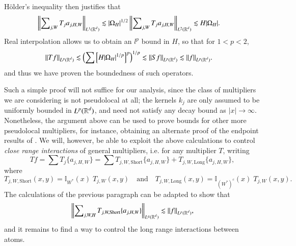 %
%
%
H\"{o}lder's inequality then justifies that
%
\begin{equation}
\begin{split}
  \left\| \sum\nolimits_{j,W} T_j a_{j,H,W} \right\|_{L^1(\operatorname{\mathbb{R}}^d)} &\lesssim |\Omega_H|^{1/2} \left\| \sum\nolimits_{j,W} T_j a_{j,H,W} \right\|_{L^2(\operatorname{\mathbb{R}}^d)} \lesssim H |\Omega_H|.
\end{split}
\end{equation}
%
Real interpolation allows us to obtain an $l^p$ bound in $H$, so that for $1 < p < 2$,
%
\begin{equation}
\begin{split}
  \| Tf \|_{L^p(\operatorname{\mathbb{R}}^d)} &\lesssim \left( \sum \left[ H |\Omega_H|^{1/p} \right]^p \right)^{1/p} \lesssim \| S f \|_{L^p(\operatorname{\mathbb{R}}^d)} \lesssim \| f \|_{L^p(\operatorname{\mathbb{R}}^d)}.
\end{split}
\end{equation}
%
and thus we have proven the boundedness of such operators.

Such a simple proof will not suffice for our analysis, since the class of multipliers we are considering is not pseudolocal at all; the kernels $k_j$ are only assumed to be uniformly bounded in $L^p(\operatorname{\mathbb{R}}^d)$, and need not satisfy any decay bound as $|x| \to \infty$. Nonetheless, the argument above can be used to prove bounds for other more pseudolocal multipliers, for instance, obtaining an alternate proof of the endpoint results of \cite{SeegerSingular}. We will, however, be able to exploit the above calculations to control \emph{close range interactions} of general multipliers, i.e. for any multiplier $T$, writing
%
\begin{equation}
  Tf = \sum T_j \{ a_{j,H,W} \} = \sum T_{j,W,\text{Short}} \{ a_{j,H,W} \} + T_{j,W,\text{Long}} \{ a_{j,H,W} \},
\end{equation}
%
where
%
\begin{equation}
  T_{j,W,\text{Short}}(x,y) = \mathbb{I}_{W^*}(x)\; T_{j,W}(x,y) \quad\text{and}\quad T_{j,W,\text{Long}}(x,y) = \mathbb{I}_{(W^*)^c}(x)\; T_{j,W}(x,y).
\end{equation}
%
The calculations of the previous paragraph can be adapted to show that
%
\begin{equation}
  \left\| \sum\nolimits_{j,W,H} T_{j,W,\text{Short}} \{ a_{j,H,W} \} \right\|_{L^q(\operatorname{\mathbb{R}}^d)} \lesssim \| f \|_{L^p(\operatorname{\mathbb{R}}^d)},
\end{equation}
%
and it remains to find a way to control the long range interactions between atoms.

